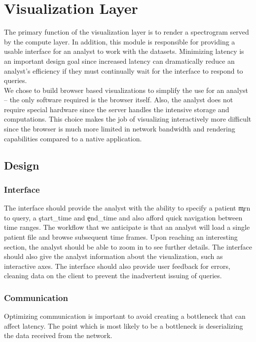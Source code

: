 \chapter{Visualization Layer}\label{viz-ch}

The primary function of the visualization layer is to render a spectrogram
served by the compute layer. In addition, this module is responsible for
providing a usable interface for an analyst to work with the datasets.
Minimizing latency is an important design goal since increased latency can
dramatically reduce an analyst's efficiency if they must continually wait for
the interface to respond to queries. \\

We chose to build browser based visualizations to simplify the use for an
analyst -- the only software required is the browser itself. Also, the analyst
does not require special hardware since the server handles the intensive
storage and computations.  This choice makes the job of visualizing
interactively more difficult since the browser is much more limited in network
bandwidth and rendering capabilities compared to a native application.

\section{Design}

\subsection{Interface}

The interface should provide the analyst with the ability to specify a patient
\c{mrn} to query, a \c{start\_time} and \c{end\_time} and also afford quick
navigation between time ranges. The workflow that we anticipate is that an
analyst will load a single patient file and browse subsequent time frames. Upon
reaching an interesting section, the analyst should be able to zoom in to see
further details. The interface should also give the analyst information about
the visualization, such as interactive axes. The interface should also provide
user feedback for errors, cleaning data on the client to prevent the
inadvertent issuing of queries.

\subsection{Communication}

Optimizing communication is important to avoid creating a bottleneck that can
affect latency. The point which is most likely to be a bottleneck is
deserializing the data received from the network.


